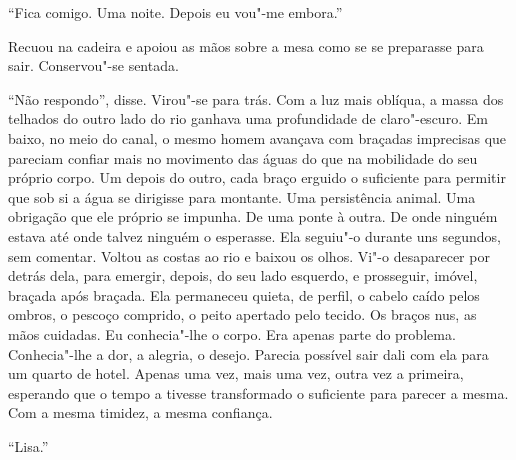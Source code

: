 ``Fica comigo. Uma noite. Depois eu vou"-me embora.''

Recuou na cadeira e apoiou as mãos sobre a mesa como se se preparasse
para sair. Conservou"-se sentada.

``Não respondo'',
disse. Virou"-se para trás. Com a luz mais oblíqua, a massa dos telhados
do outro lado do rio ganhava uma profundidade de claro"-escuro. Em
baixo, no meio do canal, o mesmo homem avançava com braçadas imprecisas
que pareciam confiar mais no movimento das águas do que na mobilidade do
seu próprio corpo. Um depois do outro, cada braço erguido o suficiente
para permitir que sob si a água se dirigisse para montante. Uma
persistência animal. Uma obrigação que ele próprio se impunha. De uma
ponte à outra. De onde ninguém estava até onde talvez ninguém o
esperasse. Ela seguiu"-o durante uns segundos, sem comentar. Voltou as
costas ao rio e baixou os olhos. Vi"-o desaparecer por detrás dela, para
emergir, depois, do seu lado esquerdo, e prosseguir, imóvel, braçada
após braçada. Ela permaneceu quieta, de perfil, o cabelo caído pelos
ombros, o pescoço comprido, o peito apertado pelo tecido. Os braços nus,
as mãos cuidadas. Eu conhecia"-lhe o corpo. Era apenas parte do
problema. Conhecia"-lhe a dor, a alegria, o desejo. Parecia possível
sair dali com ela para um quarto de hotel. Apenas uma vez, mais uma vez,
outra vez a primeira, esperando que o tempo a tivesse transformado o
suficiente para parecer a mesma. Com a mesma timidez, a mesma confiança.

``Lisa.''

